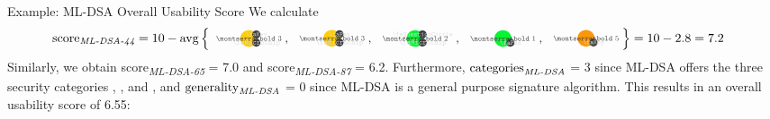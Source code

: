 \begin{algorithmbox}{Example: ML-DSA Overall Usability Score}
	\tiny
	We calculate
	\vspace{-4mm}
	\begin{align*}
		\textnormal{score\textsubscript{\itshape ML-DSA-44}} &= \textnormal{10} - \avg\left\{{
		\tripleicon{\montserratbold 3}{\faMicrochip}{themeyellow}{0.6}{\faKey}\hspace{-1mm}\textnormal{, } %
		\tripleicon{\montserratbold 3}{\faMicrochip}{themeyellow}{0.6}{\faPen}\hspace{-1mm}\textnormal{, } %
		\tripleicon{\montserratbold 2}{\faMicrochip}{themegreen}{0.6}{\faQuestionCircle}\hspace{-1mm}\textnormal{, } %
		\doubleicon{\montserratbold 1}{\faPen}{themegreen}{0.6}\hspace{-1mm}\textnormal{, } %
		\doubleicon{\montserratbold 5}{\faKey}{themeorange}{0.6}\hspace{-1mm}
		}\right\} = \textnormal{10} - \textnormal{2.8} = \textnormal{7.2}
	\end{align*}
	Similarly, we obtain \textnormal{score\textsubscript{\itshape ML-DSA-65}} = 7.0 and \textnormal{score\textsubscript{\itshape ML-DSA-87}} = 6.2. Furthermore, $\textnormal{categories}_\textnormal{\itshape ML-DSA}$ = 3 since ML-DSA offers the three security categories \hspace{-2mm}, \hspace{-2mm}, and \hspace{-2mm}, and $\textnormal{generality}_\textnormal{\itshape ML-DSA}$ = 0 since ML-DSA is a general purpose signature algorithm. This results in an overall usability score of 6.55:\\[\baselineskip]


\end{algorithmbox}
